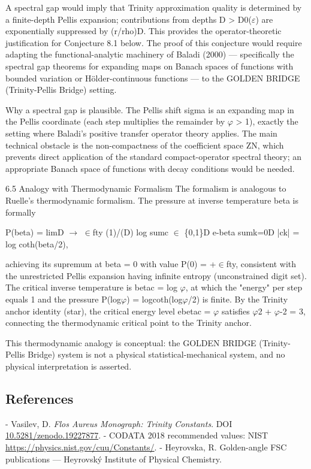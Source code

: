   A spectral gap would imply that Trinity approximation quality is determined by a
  finite-depth Pellis expansion; contributions from depths D > D0($\varepsilon$) are exponentially
  suppressed by (r/rho)D. This provides the operator-theoretic justification for Conjecture
  8.1 below. The proof of this conjecture would require adapting the functional-analytic
  machinery of Baladi (2000) --- specifically the spectral gap theorems for expanding
  maps on Banach spaces of functions with bounded variation or Hölder-continuous
  functions --- to the GOLDEN BRIDGE (Trinity-Pellis Bridge) setting.

  Why a spectral gap is plausible. The Pellis shift sigma is an expanding map in the Pellis
  coordinate (each step multiplies the remainder by $\varphi$ > 1), exactly the setting where
  Baladi's positive transfer operator theory applies. The main technical obstacle is the
  non-compactness of the coefficient space ZN, which prevents direct application of the
  standard compact-operator spectral theory; an appropriate Banach space of functions
  with decay conditions would be needed.

  6.5 Analogy with Thermodynamic Formalism
  The formalism is analogous to Ruelle's thermodynamic formalism. The pressure at
  inverse temperature beta is formally

  P(beta) = limD $\rightarrow$ $\in$fty (1)/(D) log sumc $\in$ \{0,1\}D e-beta sumk=0D |ck| = log
  coth(beta/2),

  achieving its supremum at beta = 0 with value P(0) = +$\in$fty, consistent with the
  unrestricted Pellis expansion having infinite entropy (unconstrained digit set). The
  critical inverse temperature is betac = log $\varphi$, at which the "energy" per step equals 1
  and the pressure P(log$\varphi$) = logcoth(log$\varphi$/2) is finite. By the Trinity anchor identity
  (star), the critical energy level ebetac = $\varphi$ satisfies $\varphi$2 + $\varphi$-2 = 3, connecting the
  thermodynamic critical point to the Trinity anchor.

  This thermodynamic analogy is conceptual: the GOLDEN BRIDGE (Trinity-Pellis Bridge) system is not a physical
  statistical-mechanical system, and no physical interpretation is asserted.

\subsection{References}

- Vasilev, D. \textit{Flos Aureus Monograph: Trinity Constants}. DOI \href{https://zenodo.org/doi/10.5281/zenodo.19227877}{10.5281/zenodo.19227877}.
- CODATA 2018 recommended values: NIST \href{https://physics.nist.gov/cuu/Constants/}{https://physics.nist.gov/cuu/Constants/}.
- Heyrovska, R. Golden-angle FSC publications --- Heyrovský Institute of Physical Chemistry.
